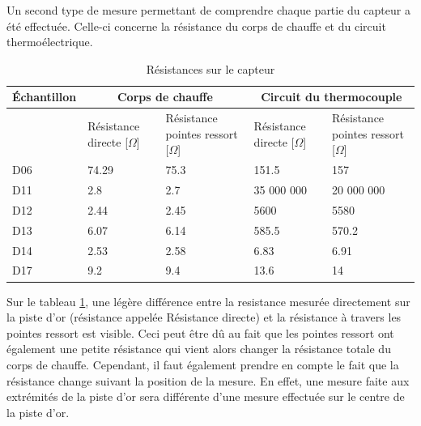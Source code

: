 Un second type de mesure permettant de comprendre chaque partie du \gls{capteur} a été effectuée. Celle-ci concerne la résistance du corps de
chauffe et du circuit thermoélectrique.
\begin{table}[H]
    \begin{center}
        \begin{tabular}{|p{2cm}|p{2.5cm}|p{2.5cm}|p{2.5cm}|p{2.5cm}|}
            \hline
            Échantillon & \multicolumn{2}{|c|}{Corps de chauffe} & \multicolumn{2}{|c|}{Circuit du thermocouple}                                                                         \\
            \hline
                        & Résistance directe [$\Omega$]          & Résistance pointes ressort [$\Omega$]         & Résistance directe [$\Omega$] & Résistance pointes ressort [$\Omega$] \\
            \hline
            D06         & 74.29                                  & 75.3                                          & 151.5                         & 157                                   \\
            \hline
            D11         & 2.8                                    & 2.7                                           & 35 000 000                    & 20 000 000                            \\
            \hline
            D12         & 2.44                                   & 2.45                                          & 5600                          & 5580                                  \\
            \hline
            D13         & 6.07                                   & 6.14                                          & 585.5                         & 570.2                                 \\
            \hline
            D14         & 2.53                                   & 2.58                                          & 6.83                          & 6.91                                  \\
            \hline
            D17         & 9.2                                    & 9.4                                           & 13.6                          & 14                                    \\
            \hline
        \end{tabular}
        \caption{Résistances sur le capteur}
        \label{tab:resistancePointeRessort}
    \end{center}
\end{table}
Sur le tableau \ref*{tab:resistancePointeRessort}, une légère différence entre la resistance mesurée directement sur la piste d'or (résistance 
appelée Résistance directe) et la résistance à travers les pointes ressort est visible. Ceci peut être dû au fait que les pointes ressort ont 
également une petite résistance qui vient alors changer la résistance totale du corps de chauffe. Cependant, il faut également prendre en 
compte le fait que la résistance change suivant la position de la mesure. En effet, une mesure faite aux extrémités de la piste d'or sera différente 
d'une mesure effectuée sur le centre de la piste d'or. \\

